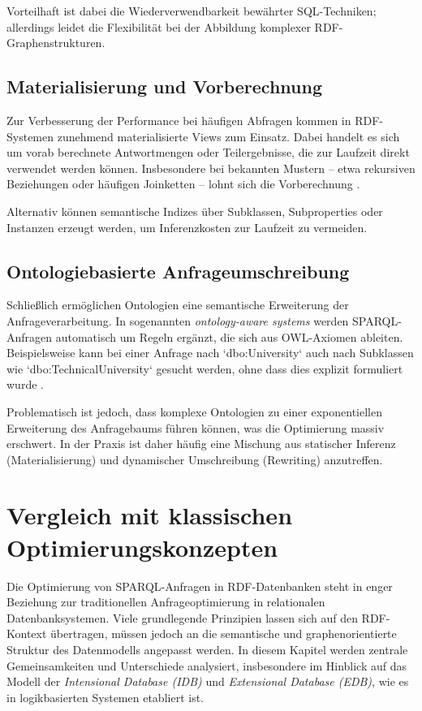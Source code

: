 \documentclass[12pt]{article}
\begin{document}
Vorteilhaft ist dabei die Wiederverwendbarkeit bewährter SQL-Techniken; allerdings leidet die Flexibilität bei der Abbildung komplexer RDF-Graphenstrukturen.

\subsection{Materialisierung und Vorberechnung}

Zur Verbesserung der Performance bei häufigen Abfragen kommen in RDF-Systemen zunehmend materialisierte Views zum Einsatz. Dabei handelt es sich um vorab berechnete Antwortmengen oder Teilergebnisse, die zur Laufzeit direkt verwendet werden können. Insbesondere bei bekannten Mustern – etwa rekursiven Beziehungen oder häufigen Joinketten – lohnt sich die Vorberechnung \cite{elzein2019materialized}.

Alternativ können semantische Indizes über Subklassen, Subproperties oder Instanzen erzeugt werden, um Inferenzkosten zur Laufzeit zu vermeiden.

\subsection{Ontologiebasierte Anfrageumschreibung}

Schließlich ermöglichen Ontologien eine semantische Erweiterung der Anfrageverarbeitung. In sogenannten \textit{ontology-aware systems} werden SPARQL-Anfragen automatisch um Regeln ergänzt, die sich aus OWL-Axiomen ableiten. Beispielsweise kann bei einer Anfrage nach `dbo:University` auch nach Subklassen wie `dbo:TechnicalUniversity` gesucht werden, ohne dass dies explizit formuliert wurde \cite{tsatsanifos2012ontologies}.

Problematisch ist jedoch, dass komplexe Ontologien zu einer exponentiellen Erweiterung des Anfragebaums führen können, was die Optimierung massiv erschwert. In der Praxis ist daher häufig eine Mischung aus statischer Inferenz (Materialisierung) und dynamischer Umschreibung (Rewriting) anzutreffen.

\section{Vergleich mit klassischen Optimierungskonzepten} \label{sec:vergleich}

Die Optimierung von SPARQL-Anfragen in RDF-Datenbanken steht in enger Beziehung zur traditionellen Anfrageoptimierung in relationalen Datenbanksystemen. Viele grundlegende Prinzipien lassen sich auf den RDF-Kontext übertragen, müssen jedoch an die semantische und graphenorientierte Struktur des Datenmodells angepasst werden. In diesem Kapitel werden zentrale Gemeinsamkeiten und Unterschiede analysiert, insbesondere im Hinblick auf das Modell der \textit{Intensional Database (IDB)} und \textit{Extensional Database (EDB)}, wie es in logikbasierten Systemen etabliert ist.
\end{document}
